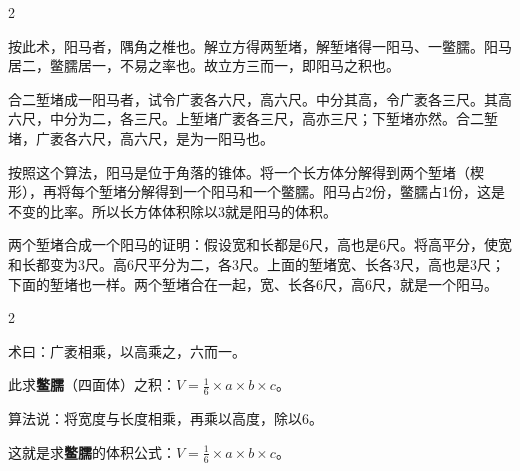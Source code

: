 \documentclass[11pt,a4paper]{article}
\begin{document}
\vspace{0.2cm}

\begin{paracol}{2}

\begin{commentarybox}
按此术，阳马者，隅角之椎也。解立方得两堑堵，解堑堵得一阳马、一鳖臑。阳马居二，鳖臑居一，不易之率也。故立方三而一，即阳马之积也。

合二堑堵成一阳马者，试令广袤各六尺，高六尺。中分其高，令广袤各三尺。其高六尺，中分为二，各三尺。上堑堵广袤各三尺，高亦三尺；下堑堵亦然。合二堑堵，广袤各六尺，高六尺，是为一阳马也。
\end{commentarybox}

\switchcolumn

\begin{commentarybox}
按照这个算法，阳马是位于角落的锥体。将一个长方体分解得到两个堑堵（楔形），再将每个堑堵分解得到一个阳马和一个鳖臑。阳马占2份，鳖臑占1份，这是不变的比率。所以长方体体积除以3就是阳马的体积。

两个堑堵合成一个阳马的证明：假设宽和长都是6尺，高也是6尺。将高平分，使宽和长都变为3尺。高6尺平分为二，各3尺。上面的堑堵宽、长各3尺，高也是3尺；下面的堑堵也一样。两个堑堵合在一起，宽、长各6尺，高6尺，就是一个阳马。
\end{commentarybox}

\end{paracol}

\vspace{0.3cm}

\begin{paracol}{2}

\begin{methodbox}
术曰：广袤相乘，以高乘之，六而一。

\vspace{0.3em}
此求\textbf{鳖臑}（四面体）之积：$V = \frac{1}{6} \times a \times b \times c$。
\end{methodbox}

\switchcolumn

\begin{methodbox}
算法说：将宽度与长度相乘，再乘以高度，除以6。

\vspace{0.3em}
这就是求\textbf{鳖臑}的体积公式：$V = \frac{1}{6} \times a \times b \times c$。
\end{methodbox}

\end{paracol}
\end{document}
